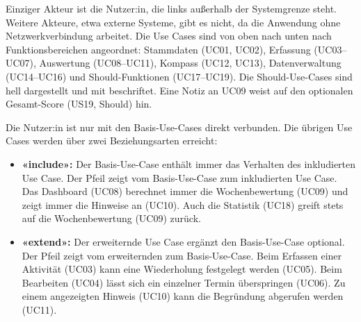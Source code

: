 Einziger Akteur ist die Nutzer:in, die links außerhalb der Systemgrenze  steht. Weitere Akteure, etwa externe Systeme, gibt es nicht, da die Anwendung ohne Netzwerkverbindung arbeitet. Die Use Cases sind von oben nach unten nach Funktionsbereichen angeordnet: Stammdaten (UC01, UC02), Erfassung (UC03--UC07), Auswertung (UC08--UC11), Kompass (UC12, UC13), Datenverwaltung (UC14--UC16) und Should-Funktionen (UC17--UC19). Die Should-Use-Cases sind hell dargestellt und mit  beschriftet. Eine Notiz an UC09 weist auf den optionalen Gesamt-Score (US19, Should) hin.

Die Nutzer:in ist nur mit den Basis-Use-Cases direkt verbunden. Die übrigen Use Cases werden über zwei Beziehungsarten erreicht:
\begin{itemize}
  \item \textbf{«include»:} Der Basis-Use-Case enthält immer das Verhalten des inkludierten Use Case. Der Pfeil zeigt vom Basis-Use-Case zum inkludierten Use Case. Das Dashboard (UC08) berechnet immer die Wochenbewertung (UC09) und zeigt immer die Hinweise an (UC10). Auch die Statistik (UC18) greift stets auf die Wochenbewertung (UC09) zurück.
  \item \textbf{«extend»:} Der erweiternde Use Case ergänzt den Basis-Use-Case optional. Der Pfeil zeigt vom erweiternden zum Basis-Use-Case. Beim Erfassen einer Aktivität (UC03) kann eine Wiederholung festgelegt werden (UC05). Beim Bearbeiten (UC04) lässt sich ein einzelner Termin überspringen (UC06). Zu einem angezeigten Hinweis (UC10) kann die Begründung abgerufen werden (UC11).
\end{itemize}

